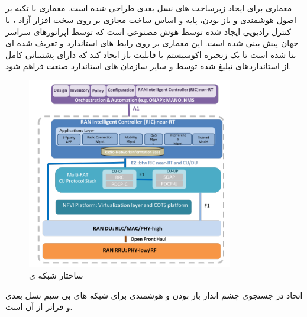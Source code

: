\subsection{}
معماری  برای ایجاد زیرساخت های  نسل بعدی طراحی شده است.
معماری  با تکیه بر اصول هوشمندی و باز بودن، پایه و اساس ساخت  مجازی بر روی سخت افزار آزاد ، با کنترل رادیویی ایجاد شده توسط هوش مصنوعی است که توسط اپراتورهای سراسر جهان پیش بینی شده است.
این معماری بر روی رابط های استاندارد و تعریف شده ای بنا شده است تا یک زنجیره اکوسیستم با قابلیت باز ایجاد کند که دارای پشتیبانی کامل از استانداردهای تبلیغ شده توسط  و سایر سازمان های استاندارد صنعت فراهم شود.
\begin{figure}[H]
  \centering
    \includegraphics[width=0.8\textwidth]{./fig/oran1}
  \caption{ساختار شبکه ی  \cite{oranWP}}
  \label{fig:ORAN}
\end{figure}
اتحاد  در جستجوی چشم انداز باز بودن و هوشمندی برای شبکه های بی سیم نسل بعدی و فراتر از آن است.
